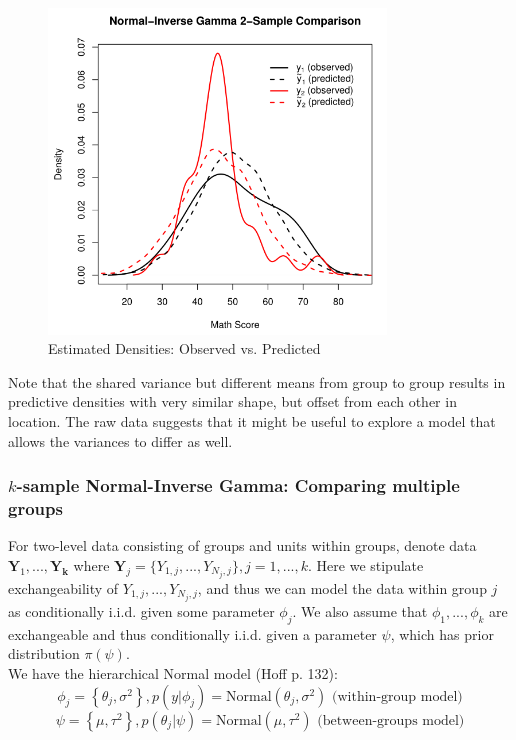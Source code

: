 \documentclass[12pt, a4paper]{article}
\begin{document}
\begin{figure}[ht]
  \centering
  \includegraphics[width=0.8\textwidth]{./Graphics/ExamplePlots/NormIG2_Data_v_Prediction}
  \caption{Estimated Densities: Observed vs. Predicted}
  \label{fig:NormIG2_DvP}
\end{figure}


\noindent Note that the shared variance but different means from group to group results in predictive densities with very similar shape, but offset from each other in location.  The raw data suggests that it might be useful to explore a model that allows the variances to differ as well.\\

    \subsubsection{$k$-sample Normal-Inverse Gamma:  Comparing multiple groups}

    For two-level data consisting of groups and units within groups, denote data $\mathbf{Y}_1,...,\mathbf{Y_k}$ where $\mathbf{Y}_j = \{Y_{1,j},...,Y_{N_j,j}\}, j=1,...,k$. Here we stipulate exchangeability of $Y_{1,j},...,Y_{N_j,j}$, and thus we can model the data within group $j$ as conditionally i.i.d. given some parameter $\phi_j$.  We also assume that $\phi_1,...,\phi_k$ are exchangeable and thus conditionally i.i.d. given a parameter $\psi$, which has prior distribution $\pi(\psi)$.\\

\noindent We have the hierarchical Normal model (Hoff p. 132):
    $$\phi_j = \left\{\theta_j,\sigma^2\right\}, p\left(y|\phi_j\right) = \text{Normal}\left(\theta_j,\sigma^2\right) \text{ (within-group model)}$$
    $$\psi = \left\{\mu,\tau^2\right\}, p\left(\theta_j|\psi\right) = \text{Normal}\left(\mu,\tau^2\right) \text{ (between-groups model)}$$
\end{document}
